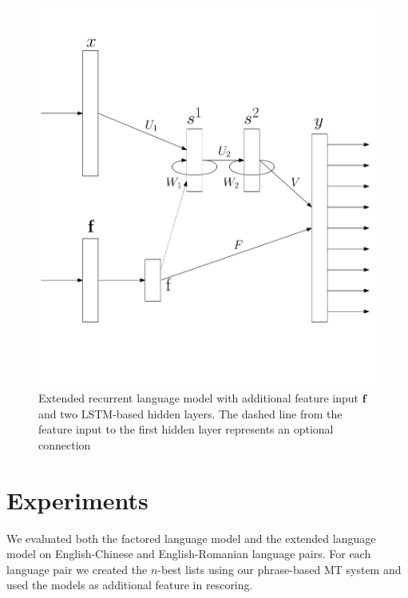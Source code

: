 \documentclass[a4paper]{article}
\begin{document}
\begin{figure} 
\centering 
\includegraphics[width=\columnwidth]{ModelExtended2.pdf}
\caption{Extended recurrent language model with additional feature input $\textbf{f}$ and two LSTM-based hidden layers. The dashed line from the feature input to the first hidden layer represents an optional connection}
\label{fig:model-extended}
\end{figure}


\section{Experiments}
We evaluated both the factored language model and the extended language model on English-Chinese and English-Romanian language pairs. For each language pair we created the $n$-best lists using our phrase-based MT system and used the models as additional feature in rescoring.
\end{document}
